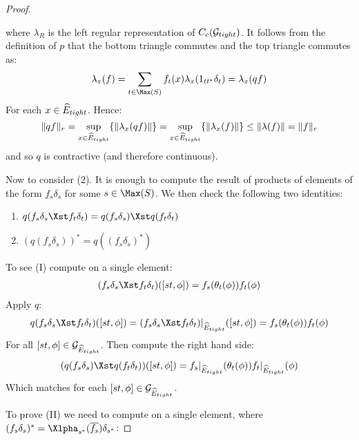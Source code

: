 \begin{corollary}
\begin{proof}
\begin{center}
\begin{tikzpicture}
\end{tikzpicture}
\end{center}

where $\lambda_{R}$ is the left regular representation of $C_{c}(\G_{tight})$. It follows from the definition of $p$ that the bottom triangle commutes and the top triangle commutes as:
\begin{equation*}
\lambda_{x}(f) =\sum_{t \in \Max(S)} f_{t}(x)\lambda_{x}(1_{tt^{*}}\delta_{t}) = \lambda_{x}(qf)
\end{equation*}
For each $x \in \E_{tight}$. Hence:
\begin{equation*}
\Vert qf \Vert_{r} = \sup_{x \in \E_{tight}} \lbrace \Vert \lambda_{x}(qf) \Vert \rbrace = \sup_{x \in \E_{tight}} \lbrace \Vert \lambda_{x}(f) \Vert \rbrace \leq \Vert \lambda(f) \Vert = \Vert f \Vert_{r}
\end{equation*}
and so $q$ is contractive (and therefore continuous).
 
Now to consider (2). It is enough to compute the result of products of elements of the form $f_{s}\delta_{s}$ for some $s \in \Max(S)$. We then check the following two identities:


\begin{enumerate}[I]
\item $q(f_{s}\delta_{s} \Xst f_{t}\delta_{t}) = q(f_{s}\delta_{s})\Xst q(f_{t}\delta_{t})$
\item $(q(f_{s}\delta_{s}))^{*}=q((f_{s}\delta_{s})^{*})$
\end{enumerate}


To see (I) compute on a single element:
\begin{eqnarray*}
(f_{s}\delta_{s} \Xst f_{t}\delta_{t})([st,\phi])=f_{s}(\theta_{t}(\phi))f_{t}(\phi)
\end{eqnarray*}
Apply $q$:
\begin{eqnarray*}
q(f_{s}\delta_{s} \Xst f_{t}\delta_{t})([st,\phi])= (f_{s}\delta_{s} \Xst f_{t}\delta_{t})|_{\E_{tight}}([st,\phi]) =f_{s}(\theta_{t}(\phi))f_{t}(\phi)
\end{eqnarray*}
For all $[st,\phi] \in \G_{\E_{tight}}$. Then compute the right hand side: 
\begin{eqnarray*}
(q(f_{s}\delta_{s}) \Xst q(f_{t}\delta_{t}))([st,\phi])=f_{s}|_{\E_{tight}}(\theta_{t}(\phi))f_{t}|_{\E_{tight}}(\phi)
\end{eqnarray*}
Which matches for each $[st,\phi] \in \G_{\E_{tight}}$. 

To prove (II) we need to compute on a single element, where $(f_{s}\delta_{s})^{*}=\Xlpha_{s^{*}}(\overline{f_{s}})\delta_{s^{*}}$:


\end{proof}
\end{corollary}
